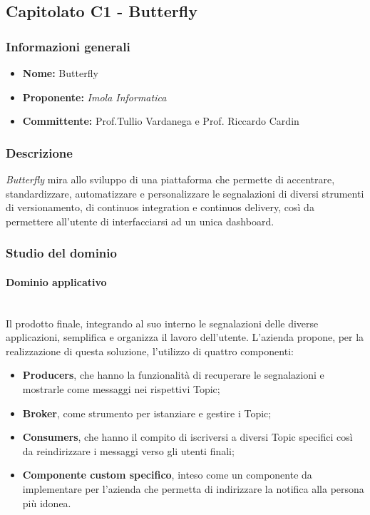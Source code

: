 \subsection{Capitolato C1 - Butterfly}
\subsubsection{Informazioni generali}
\begin{itemize}
\item
\textbf{Nome:} Butterfly 
\item
\textbf{Proponente:} \textit{Imola Informatica} 
\item
\textbf{Committente:} Prof.Tullio Vardanega e Prof. Riccardo Cardin
\end{itemize}
\subsubsection{Descrizione}
\textit{Butterfly} mira allo sviluppo di una piattaforma che permette di
 accentrare, standardizzare, automatizzare e personalizzare le segnalazioni di
 diversi strumenti di versionamento, di continuos integration e continuos
 delivery, così da permettere all'utente di interfacciarsi ad un unica 
 dashboard.
\subsubsection{Studio del dominio}
\paragraph{Dominio applicativo}\mbox{}\\
Il prodotto finale, integrando al suo interno le segnalazioni delle diverse 
applicazioni, semplifica e organizza il lavoro dell'utente. L'azienda propone,
per la realizzazione di questa soluzione, l'utilizzo di quattro componenti:
\begin{itemize}
	\item \textbf{Producers}, che hanno la funzionalità di recuperare le
	segnalazioni e mostrarle come messaggi nei rispettivi Topic;
	\item \textbf{Broker}, come strumento per istanziare e gestire i Topic;
	\item \textbf{Consumers}, che hanno il compito di iscriversi a diversi Topic
    specifici così da reindirizzare i messaggi verso gli utenti finali;
    \item \textbf{Componente custom specifico}, inteso come un componente da
    implementare per l'azienda che permetta di indirizzare la notifica alla
    persona più idonea.
\end{itemize}

